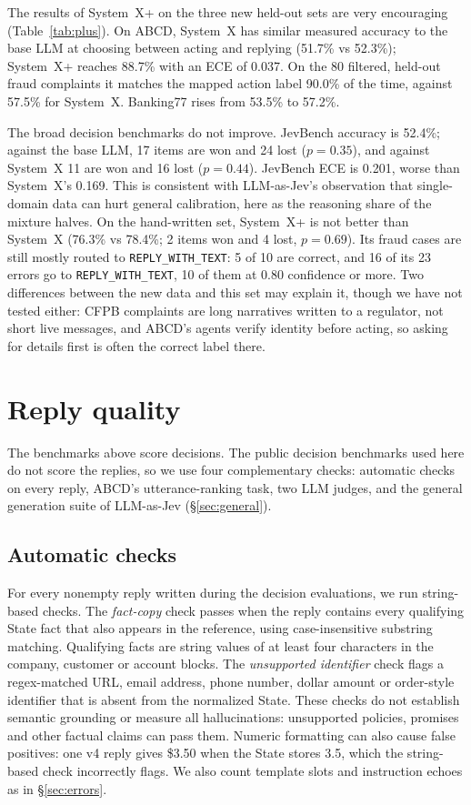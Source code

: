 \documentclass[11pt]{article}
\newcommand{\reply}{\texttt{REPLY\_WITH\_TEXT}}
\newcommand{\sysplus}{System~X+}
\begin{document}
The results of \sysplus{} on the three new held-out sets are very encouraging (Table~\ref{tab:plus}). On ABCD, System~X has similar measured accuracy to the base LLM at choosing between acting and replying (51.7\% vs 52.3\%); \sysplus{} reaches 88.7\% with an ECE of 0.037. On the 80 filtered, held-out fraud complaints it matches the mapped action label 90.0\% of the time, against 57.5\% for System~X. Banking77 rises from 53.5\% to 57.2\%.

The broad decision benchmarks do not improve. JevBench accuracy is 52.4\%; against the base LLM, 17 items are won and 24 lost ($p=0.35$), and against System~X 11 are won and 16 lost ($p=0.44$). JevBench ECE is 0.201, worse than System~X's 0.169. This is consistent with LLM-as-Jev's observation that single-domain data can hurt general calibration, here as the reasoning share of the mixture halves. On the hand-written set, \sysplus{} is not better than System~X (76.3\% vs 78.4\%; 2 items won and 4 lost, $p=0.69$). Its fraud cases are still mostly routed to \reply{}: 5 of 10 are correct, and 16 of its 23 errors go to \reply{}, 10 of them at 0.80 confidence or more. Two differences between the new data and this set may explain it, though we have not tested either: CFPB complaints are long narratives written to a regulator, not short live messages, and ABCD's agents verify identity before acting, so asking for details first is often the correct label there.

\section{Reply quality}\label{sec:replyq}

The benchmarks above score decisions. The public decision benchmarks used here do not score the replies, so we use four complementary checks: automatic checks on every reply, ABCD's utterance-ranking task, two LLM judges, and the general generation suite of LLM-as-Jev (\S\ref{sec:general}).

\subsection{Automatic checks}
For every nonempty reply written during the decision evaluations, we run string-based checks. The \emph{fact-copy} check passes when the reply contains every qualifying State fact that also appears in the reference, using case-insensitive substring matching. Qualifying facts are string values of at least four characters in the company, customer or account blocks. The \emph{unsupported identifier} check flags a regex-matched URL, email address, phone number, dollar amount or order-style identifier that is absent from the normalized State. These checks do not establish semantic grounding or measure all hallucinations: unsupported policies, promises and other factual claims can pass them. Numeric formatting can also cause false positives: one v4 reply gives \$3.50 when the State stores 3.5, which the string-based check incorrectly flags. We also count template slots and instruction echoes as in \S\ref{sec:errors}.
\end{document}
